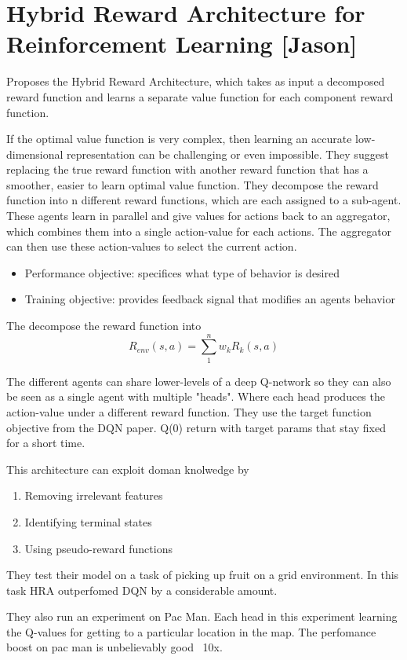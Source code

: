 \section{Hybrid Reward Architecture for Reinforcement Learning [Jason]}

Proposes the Hybrid Reward Architecture, which takes as input a decomposed reward function
and learns a separate value function for each component reward function.

If the optimal value function is very complex, then learning an accurate low-dimensional
representation can be challenging or even impossible. They suggest replacing the true reward
function with another reward function that has a smoother, easier to learn optimal value function.
They decompose the reward function into n different reward functions, which are each assigned
to a sub-agent. These agents learn in parallel and give values for actions back to an aggregator,
which combines them into a single action-value for each actions. The aggregator can then
use these action-values to select the current action.

\begin{itemize}
    \item Performance objective: specifices what type of behavior is desired
    \item Training objective: provides feedback signal that modifies an agents behavior
\end{itemize}

The decompose the reward function into
$$R_{env}(s,a) = \sum_1^nw_kR_k(s, a)$$

The different agents can share lower-levels of a deep Q-network so they can also
be seen as a single agent with multiple "heads". Where each head produces
the action-value under a different reward function. They use the target
function objective from the DQN paper. Q(0) return with target params that
stay fixed for a short time.

This architecture can exploit doman knolwedge by
\begin{enumerate}
    \item Removing irrelevant features
    \item Identifying terminal states
    \item Using pseudo-reward functions
\end{enumerate}

They test their model on a task of picking up fruit on a grid environment.
In this task HRA outperfomed DQN by a considerable amount.

They also run an experiment on Pac Man. Each head in this experiment
learning the Q-values for getting to a particular location in the map.
The perfomance boost on pac man is unbelievably good ~10x.


